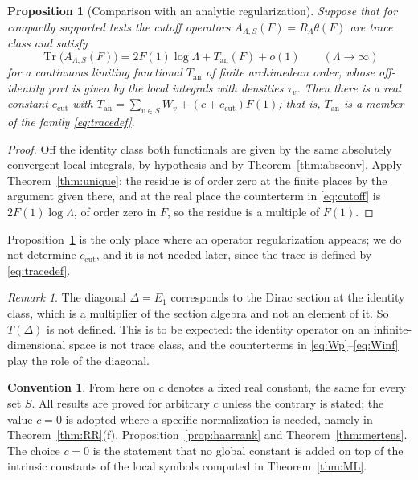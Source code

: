 \documentclass[11pt]{amsart}
\newtheorem{proposition}[theorem]{Proposition}
\theoremstyle{definition}
\newtheorem{convention}[theorem]{Convention}
\theoremstyle{remark}
\newtheorem{remark}[theorem]{Remark}
\newcommand{\Tr}{\operatorname{Tr}}
\begin{document}
\begin{proposition}[Comparison with an analytic
regularization]\label{prop:comparison}
Suppose that for compactly supported tests the cutoff operators
$A_{\Lambda,S}(F)=R_{\Lambda}\theta(F)$ are trace class and satisfy
\begin{equation}\label{eq:cutoff}
\Tr\bigl(A_{\Lambda,S}(F)\bigr)=2F(1)\log\Lambda+T_{\mathrm{an}}(F)+o(1)
\qquad(\Lambda\to\infty)
\end{equation}
for a continuous limiting functional $T_{\mathrm{an}}$ of finite archimedean
order, whose off-identity part is given by the local integrals with densities
$\tau_v$.  Then there is a real constant $c_{\mathrm{cut}}$ with
$T_{\mathrm{an}}=\sum_{v\in S}W_v+(c+c_{\mathrm{cut}})F(1)$; that is,
$T_{\mathrm{an}}$ is a member of the family \eqref{eq:tracedef}.
\end{proposition}

\begin{proof}
Off the identity class both functionals are given by the same absolutely
convergent local integrals, by hypothesis and by
Theorem~\ref{thm:absconv}.  Apply Theorem~\ref{thm:unique}: the residue is of
order zero at the finite places by the argument given there, and at the real
place the counterterm in \eqref{eq:cutoff} is $2F(1)\log\Lambda$, of order zero
in $F$, so the residue is a multiple of $F(1)$.
\end{proof}

Proposition~\ref{prop:comparison} is the only place where an operator
regularization appears; we do not determine $c_{\mathrm{cut}}$, and it is not
needed later, since the trace is defined by \eqref{eq:tracedef}.

\begin{remark}\label{rem:diagonal}
The diagonal $\Delta=E_1$ corresponds to the Dirac section at the identity
class, which is a multiplier of the section algebra and not an element of it.
So $T(\Delta)$ is not defined.  This is to be expected: the identity operator
on an infinite-dimensional space is not trace class, and the counterterms in
\eqref{eq:Wp}--\eqref{eq:Winf} play the role of the diagonal.
\end{remark}

\begin{convention}\label{conv:c}
From here on $c$ denotes a fixed real constant, the same for every set $S$.
All results are proved for arbitrary $c$ unless the contrary is stated; the
value $c=0$ is adopted where a specific normalization is needed, namely in
Theorem~\ref{thm:RR}(f), Proposition~\ref{prop:haarrank} and
Theorem~\ref{thm:mertens}.  The choice $c=0$ is the statement that no global
constant is added on top of the intrinsic constants of the local symbols
computed in Theorem~\ref{thm:ML}.
\end{convention}
\end{document}
